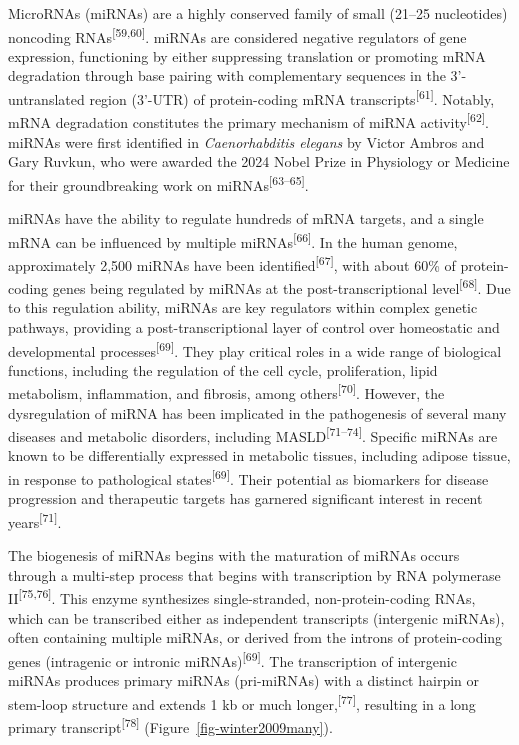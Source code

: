 \documentclass[
  11pt,
  letterpaper,
]{book}
\begin{document}
MicroRNAs (miRNAs) are a highly conserved family of small (21--25
nucleotides) noncoding RNAs\textsuperscript{{[}59,60{]}}. miRNAs are
considered negative regulators of gene expression, functioning by either
suppressing translation or promoting mRNA degradation through base
pairing with complementary sequences in the 3'-untranslated region
(3'-UTR) of protein-coding mRNA transcripts\textsuperscript{{[}61{]}}.
Notably, mRNA degradation constitutes the primary mechanism of miRNA
activity\textsuperscript{{[}62{]}}. miRNAs were first identified in
\emph{Caenorhabditis elegans} by Victor Ambros and Gary Ruvkun, who were
awarded the 2024 Nobel Prize in Physiology or Medicine for their
groundbreaking work on miRNAs\textsuperscript{{[}63--65{]}}.

miRNAs have the ability to regulate hundreds of mRNA targets, and a
single mRNA can be influenced by multiple
miRNAs\textsuperscript{{[}66{]}}. In the human genome, approximately
2,500 miRNAs have been identified\textsuperscript{{[}67{]}}, with about
60\% of protein-coding genes being regulated by miRNAs at the
post-transcriptional level\textsuperscript{{[}68{]}}. Due to this
regulation ability, miRNAs are key regulators within complex genetic
pathways, providing a post-transcriptional layer of control over
homeostatic and developmental processes\textsuperscript{{[}69{]}}. They
play critical roles in a wide range of biological functions, including
the regulation of the cell cycle, proliferation, lipid metabolism,
inflammation, and fibrosis, among others\textsuperscript{{[}70{]}}.
However, the dysregulation of miRNA has been implicated in the
pathogenesis of several many diseases and metabolic disorders, including
MASLD\textsuperscript{{[}71--74{]}}. Specific miRNAs are known to be
differentially expressed in metabolic tissues, including adipose tissue,
in response to pathological states\textsuperscript{{[}69{]}}. Their
potential as biomarkers for disease progression and therapeutic targets
has garnered significant interest in recent
years\textsuperscript{{[}71{]}}.

The biogenesis of miRNAs begins with the maturation of miRNAs occurs
through a multi-step process that begins with transcription by RNA
polymerase II\textsuperscript{{[}75,76{]}}. This enzyme synthesizes
single-stranded, non-protein-coding RNAs, which can be transcribed
either as independent transcripts (intergenic miRNAs), often containing
multiple miRNAs, or derived from the introns of protein-coding genes
(intragenic or intronic miRNAs)\textsuperscript{{[}69{]}}. The
transcription of intergenic miRNAs produces primary miRNAs (pri-miRNAs)
with a distinct hairpin or stem-loop structure and extends 1 kb or much
longer,\textsuperscript{{[}77{]}}, resulting in a long primary
transcript\textsuperscript{{[}78{]}} (Figure~\ref{fig-winter2009many}).
\end{document}
